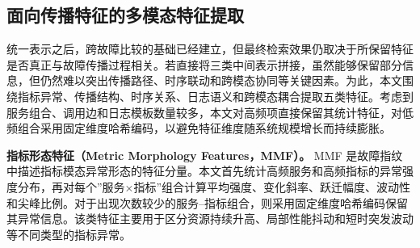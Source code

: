 \subsection{面向传播特征的多模态特征提取}

统一表示之后，跨故障比较的基础已经建立，但最终检索效果仍取决于所保留特征是否真正与故障传播过程相关。若直接将三类中间表示拼接，虽然能够保留部分信息，但仍然难以突出传播路径、时序联动和跨模态协同等关键因素。为此，本文围绕指标异常、传播结构、时序关系、日志语义和跨模态耦合提取五类特征。考虑到服务组合、调用边和日志模板数量较多，本文对高频项直接保留其统计特征，对低频组合采用固定维度哈希编码，以避免特征维度随系统规模增长而持续膨胀。

\textbf{指标形态特征（Metric Morphology Features，MMF）。}
MMF 是故障指纹中描述指标模态异常形态的特征分量。本文首先统计高频服务和高频指标的异常强度分布，再对每个”服务$\times$指标”组合计算平均强度、变化斜率、跃迁幅度、波动性和尖峰比例。对于出现次数较少的服务--指标组合，则采用固定维度哈希编码保留其异常信息。该类特征主要用于区分资源持续升高、局部性能抖动和短时突发波动等不同类型的指标异常。

